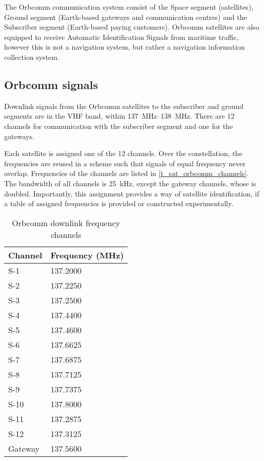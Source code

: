 The Orbcomm communication system consist of the Space segment (satellites), Ground segment (Earth-based gateways and communication centres) and the Subscriber segment (Earth-based paying customers)\cite{sop08}. Orbcomm satellites are also equipped to receive Automatic Identification Signals from maritime traffic, however this is not a navigation system, but rather a navigation information collection system\cite{sat11}.

\subsection{Orbcomm signals}
Downlink signals from the Orbcomm satellites to the subscriber and ground segments are in the VHF band, within \qtyrange{137}{138}{MHz}. There are 12 channels for communication with the subscriber segment and one for the gateways\cite{sop08}.

Each satellite is assigned one of the 12 channels. Over the constellation, the frequencies are reused in a scheme such that signals of equal frequency never overlap. Frequencies of the channels are listed in \autoref{t_sat_orbcomm_channels}. The bandwidth of all channels is \qty{25}{kHz}, except the gateway channels, whose is doubled\cite{sat13}. Importantly, this assignment provides a way of satellite identification, if a table of assigned frequencies is provided or constructed experimentally.

\begin{table}
\caption{Orbcomm downlink frequency channels\cite{sat13}}
\label{t_sat_orbcomm_channels}
\begin{tabular}{ll}
Channel & Frequency (MHz) \\ \hline
S-1     & 137.2000        \\
S-2     & 137.2250        \\
S-3     & 137.2500        \\
S-4     & 137.4400        \\
S-5     & 137.4600        \\
S-6     & 137.6625        \\
S-7     & 137.6875        \\
S-8     & 137.7125        \\
S-9     & 137.7375        \\
S-10    & 137.8000        \\
S-11    & 137.2875        \\
S-12    & 137.3125        \\
Gateway & 137.5600       
\end{tabular}
\end{table}

